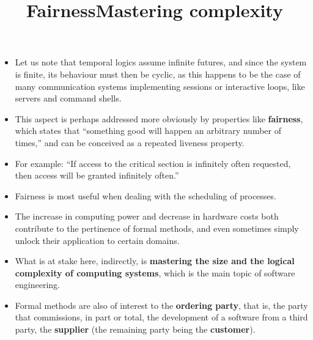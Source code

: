 \documentclass[wide]{slides}
\begin{document}
\begin{slide}
  \title{Fairness}

  \begin{itemize}

    \item Let us note that temporal logics assume infinite futures,
      and since the system is finite, its behaviour must then be
      cyclic, as this happens to be the case of many communication
      systems implementing sessions or interactive loops, like servers
      and command shells.

    \item This aspect is perhaps addressed more obviously by
      properties like \textbf{fairness}, which states that ``something
      good will happen an arbitrary number of times,'' and can be
      conceived as a repeated liveness property.

    \item For example: ``If access to the critical section is
      infinitely often requested, then access will be granted
      infinitely often.''

    \item Fairness is most useful when dealing with the scheduling of
      processes.

  \end{itemize}

\end{slide}

\begin{slide}
  \title{Mastering complexity}

  \begin{itemize}

      \item The increase in computing power and decrease in hardware
        costs both contribute to the pertinence of formal methods, and
        even sometimes simply unlock their application to certain
        domains.

      \item What is at stake here, indirectly, is \textbf{mastering
        the size and the logical complexity of computing systems},
        which is the main topic of software engineering.

      \item Formal methods are also of interest to the
        \textbf{ordering party}, that is, the party that commissions,
        in part or total, the development of a software from a third
        party, the \textbf{supplier} (the remaining party being the
        \textbf{customer}).

  \end{itemize}

\end{slide}
\end{document}
